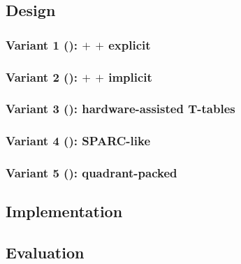 \documentclass[preprint]{iacrtrans}
\begin{document}

\subsection{Design}
\label{sec:ise:design}



\subsubsection{Variant 1 ():  $+$  $+$ explicit }
\label{sec:ise:design:v1}

\subsubsection{Variant 2 ():  $+$  $+$ implicit }
\label{sec:ise:design:v2}

\subsubsection{Variant 3 (): hardware-assisted T-tables}
\label{sec:ise:design:v3}

\subsubsection{Variant 4 (): SPARC-like}
\label{sec:ise:design:v4}

\subsubsection{Variant 5 (): quadrant-packed}
\label{sec:ise:design:v5}



\subsection{Implementation}
\label{sec:ise:imp}



\subsection{Evaluation}
\end{document}
